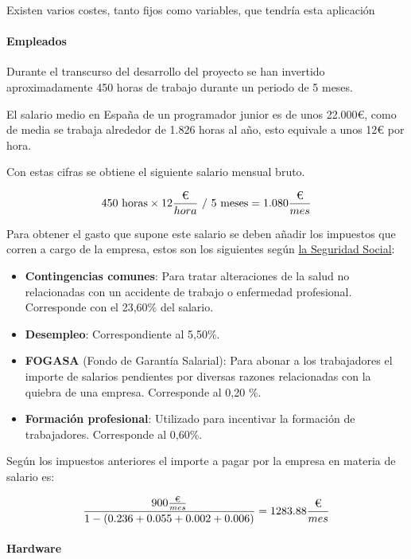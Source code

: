 Existen varios costes, tanto fijos como variables, que tendría esta aplicación

\paragraph{Empleados}

Durante el transcurso del desarrollo del proyecto se han invertido
aproximadamente 450 horas de trabajo durante un periodo de 5 meses.

El salario medio en España de un programador junior es de unos 22.000€, como de
media se trabaja alrededor de 1.826 horas al año, esto equivale a unos 12€ por
hora.

Con estas cifras se obtiene el siguiente salario mensual bruto.

$$
450\text{ horas} \times 12 \frac{\textup{€}}{hora} \text{ / } 5\text{ meses} = 1.080 \frac{\textup{€}}{mes}
$$

Para obtener el gasto que supone este salario se deben añadir los impuestos que
corren a cargo de la empresa, estos son los siguientes según
\href{https://www.seg-social.es/wps/portal/wss/internet/Trabajadores/CotizacionRecaudacionTrabajadores/36537?changeLanguage=es}{la
Seguridad Social}:

\begin{itemize}
      \item \textbf{Contingencias comunes}: Para tratar alteraciones de la salud
      no relacionadas con un accidente de trabajo o enfermedad profesional.
      Corresponde con el 23,60\% del salario.
      \item \textbf{Desempleo}: Correspondiente al 5,50\%.
      \item \textbf{FOGASA} (Fondo de Garantía Salarial): Para abonar a los
      trabajadores el importe de salarios pendientes por diversas razones
      relacionadas con la quiebra de una empresa. Corresponde al 0,20 \%.
      \item \textbf{Formación profesional}: Utilizado para incentivar la
      formación de trabajadores. Corresponde al 0,60\%.
\end{itemize}

Según los impuestos anteriores el importe a pagar por la empresa en materia de
salario es:

$$
\frac{900\frac{\textup{€}}{mes}}{1-(0.236+0.055+0.002+0.006)} = 1283.88 \frac{\textup{€}}{mes}
$$

\paragraph{Hardware}

